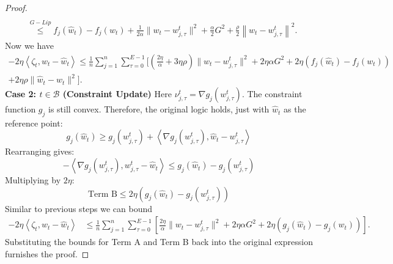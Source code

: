 \documentclass{article} %
\newcommand\norm[1]{\left\lVert#1\right\rVert}
\begin{document}
\begin{proof}
\begin{align*}
    \\
    &\overset{G-Lip}{\leq}f_j(\hat{w}_t) - f_j(w_t) + \frac{1}{2\alpha} \| w_t - w_{j,\tau}^t \|^2 + \frac{\alpha}{2}G^2 + \frac{\rho}{2}\norm{w_t - w_{j,\tau}^t}^2.
    \end{align*}
    Now we have
    \begin{align*}
        -2\eta \left\langle \zeta_t, w_t - \hat{w}_t \right\rangle \leq \frac{1}{n} \sum_{j=1}^n \sum_{\tau=0}^{E-1} \bigg[ \left(\frac{2\eta}{\alpha} + 3\eta \rho\right) \| w_t - w_{j,\tau}^t \|^2 + 2\eta \alpha G^2 + 2\eta (f_j(\hat{w}_t) - f_j(w_t))
        \\
          + 2\eta\rho \|\hat{w}_t - w_t\|^2\bigg].
    \end{align*}
    \textbf{Case 2: $t \in \mathcal{B}$ (Constraint Update)}
    Here $\nu_{j,\tau}^t = \nabla g_j(w_{j,\tau}^t)$. The constraint function $g_j$ is still {convex}. Therefore, the original logic holds, just with $\hat{w}_t$ as the reference point:
    \[
    g_j(\hat{w}_t) \geq g_j(w_{j,\tau}^t) + \left\langle \nabla g_j(w_{j,\tau}^t), \hat{w}_t - w_{j,\tau}^t \right\rangle
    \]
    Rearranging gives:
    \[
    - \left\langle \nabla g_j(w_{j,\tau}^t), w_{j,\tau}^t - \hat{w}_t \right\rangle \leq g_j(\hat{w}_t) - g_j(w_{j,\tau}^t)
    \]
    Multiplying by $2\eta$:
    \[
    \text{Term B} \leq 2\eta \left( g_j(\hat{w}_t) - g_j(w_{j,\tau}^t) \right)
    \]
    Similar to previous steps we can bound
    \begin{align*}
        -2\eta \left\langle \zeta_t, w_t - \hat{w}_t \right\rangle &\leq \frac{1}{n} \sum_{j=1}^n \sum_{\tau=0}^{E-1} \left[ \frac{2\eta}{\alpha} \| w_t - w_{j,\tau}^t \|^2 + 2\eta \alpha G^2 + 2\eta (g_j(\hat{w}_t) - g_j(w_t))\right].
    \end{align*}
    Substituting the bounds for Term A and Term B back into the original expression furnishes the proof.
\end{proof}
\end{document}
